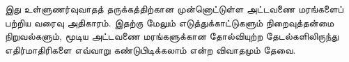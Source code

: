 \documentclass[../../../include/open-logic-chapter]{subfiles}
\begin{document}

\begin{editorial}
  இது உள்ளுணர்வுவாதத் தருக்கத்திற்கான முன்னொட்டுள்ள அட்டவணை மரங்களைப்
  பற்றிய வரைவு அதிகாரம். இதற்கு மேலும் எடுத்துக்காட்டுகளும் நிறைவுத்தன்மை
  நிறுவல்களும், மூடிய அட்டவணை மரங்களுக்கான தோல்வியுற்ற தேடல்களிலிருந்து
  எதிர்மாதிரிகளை எவ்வாறு கண்டுபிடிக்கலாம் என்ற விவாதமும் தேவை.
\end{editorial}


\OLEndChapterHook
\end{document}

